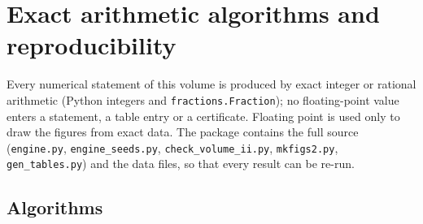 \chapter{Exact arithmetic algorithms and reproducibility}\label{app:algo}

Every numerical statement of this volume is produced by exact integer or rational arithmetic (Python integers and \texttt{fractions.Fraction}); no floating-point value enters a statement, a table entry or a certificate. Floating point is used only to draw the figures from exact data. The package contains the full source (\texttt{engine.py}, \texttt{engine\_seeds.py}, \texttt{check\_volume\_ii.py}, \texttt{mkfigs2.py}, \texttt{gen\_tables.py}) and the data files, so that every result can be re-run.

\section{Algorithms}

